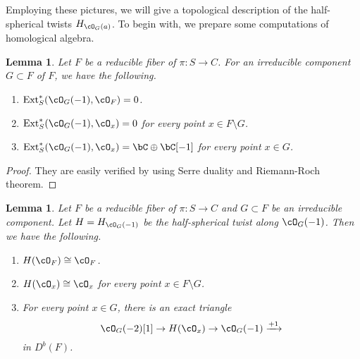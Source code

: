 \documentclass{amsart}
\numberwithin{equation}{section}
\theoremstyle{plain}
\newtheorem{lemma}[theorem]{Lemma}
\theoremstyle{definition}
\DeclareMathOperator{\Ext}{\mathrm{Ext}}
\begin{document}
Employing these pictures, we will give a topological description of the half-spherical twists $H_{\cO_G(a)}$.
To begin with, we prepare some computations of homological algebra.
\begin{lemma}
    Let $F$ be a reducible fiber of $\pi \colon S \to C$.
    For an irreducible component $G \subset F$ of $F$, we have the following.
    \begin{enumerate}
        \item $\Ext^*_S(\cO_G(-1), \cO_F) = 0$.
        \item $\Ext^*_S(\cO_G(-1), \cO_x) = 0$ for every point $x \in F \setminus G$.
        \item $\Ext^*_S(\cO_G(-1), \cO_x) = \bC\oplus\bC[-1]$ for every point $x \in G$.
    \end{enumerate}
\end{lemma}
\begin{proof}
    They are easily verified by using Serre duality and Riemann-Roch theorem.
\end{proof}
\begin{lemma}\label{lem:preparation}
    Let $F$ be a reducible fiber of $\pi \colon S \to C$ and $G \subset F$ be an irreducible component.
    Let $H = H_{\cO_G(-1)}$ be the half-spherical twist along $\cO_G(-1)$.
    Then we have the following.
    \begin{enumerate}
        \item $H(\cO_F) \cong \cO_F$.
        \item $H(\cO_x) \cong \cO_x$ for every point $x \in F \setminus G$.
        \item For every point $x \in G$, there is an exact triangle  \begin{equation}
                  \cO_G(-2)[1]\to H(\cO_x)\to \cO_G(-1) \xrightarrow{+1}
              \end{equation}
              in $D^b(F)$.
    \end{enumerate}
\end{lemma}
\end{document}
